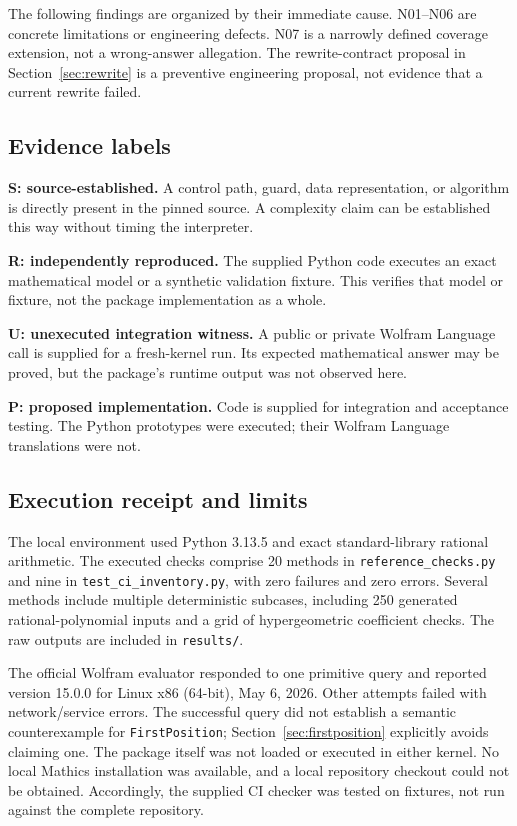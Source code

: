 \documentclass[11pt,letterpaper]{article}
\newcommand{\code}[1]{\nolinkurl{#1}}
\begin{document}
The following findings are organized by their immediate cause. N01--N06
are concrete limitations or engineering defects. N07 is a narrowly defined
coverage extension, not a wrong-answer allegation. The rewrite-contract
proposal in Section~\ref{sec:rewrite} is a preventive engineering proposal,
not evidence that a current rewrite failed.

\subsection{Evidence labels}
\textbf{S: source-established.} A control path, guard, data representation,
or algorithm is directly present in the pinned source. A complexity claim
can be established this way without timing the interpreter.

\textbf{R: independently reproduced.} The supplied Python code executes
an exact mathematical model or a synthetic validation fixture. This verifies
that model or fixture, not the package implementation as a whole.

\textbf{U: unexecuted integration witness.} A public or private Wolfram
Language call is supplied for a fresh-kernel run. Its expected mathematical
answer may be proved, but the package's runtime output was not observed here.

\textbf{P: proposed implementation.} Code is supplied for integration and
acceptance testing. The Python prototypes were executed; their Wolfram
Language translations were not.

\subsection{Execution receipt and limits}
The local environment used Python 3.13.5 and exact standard-library rational
arithmetic. The executed checks comprise 20 methods in
\code{reference_checks.py} and nine in \code{test_ci_inventory.py}, with zero
failures and zero errors. Several methods include multiple deterministic
subcases, including 250 generated rational-polynomial inputs and a grid of
hypergeometric coefficient checks. The raw outputs are included in
\code{results/}.

The official Wolfram evaluator responded to one primitive query and reported
version 15.0.0 for Linux x86 (64-bit), May 6, 2026. Other attempts failed with
network/service errors. The successful query did not establish a semantic
counterexample for \code{FirstPosition}; Section~\ref{sec:firstposition}
explicitly avoids claiming one. The package itself was not loaded or executed
in either kernel. No local Mathics installation was available, and a local
repository checkout could not be obtained. Accordingly, the supplied CI
checker was tested on fixtures, not run against the complete repository.
\end{document}
